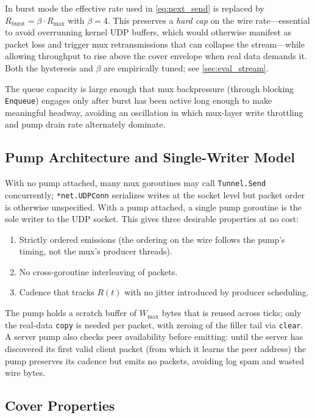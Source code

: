 \documentclass[11pt,a4paper]{article}
\begin{document}
In burst mode the effective rate used in \eqref{eq:next_send} is replaced by $R_{\text{burst}} = \beta \cdot R_{\max}$ with $\beta = 4$. This preserves a \emph{hard cap} on the wire rate---essential to avoid overrunning kernel UDP buffers, which would otherwise manifest as packet loss and trigger mux retransmissions that can collapse the stream---while allowing throughput to rise above the cover envelope when real data demands it. Both the hysteresis and $\beta$ are empirically tuned; see \cref{sec:eval_stream}.

The queue capacity is large enough that mux backpressure (through blocking \texttt{Enqueue}) engages only after burst has been active long enough to make meaningful headway, avoiding an oscillation in which mux-layer write throttling and pump drain rate alternately dominate.

\subsection{Pump Architecture and Single-Writer Model}\label{sec:pump_arch}

With no pump attached, many mux goroutines may call \texttt{Tunnel.Send} concurrently; \texttt{*net.UDPConn} serializes writes at the socket level but packet order is otherwise unspecified. With a pump attached, a single pump goroutine is the sole writer to the UDP socket. This gives three desirable properties at no cost:

\begin{enumerate}[nosep]
  \item Strictly ordered emissions (the ordering on the wire follows the pump's timing, not the mux's producer threads).
  \item No cross-goroutine interleaving of packets.
  \item Cadence that tracks $R(t)$ with no jitter introduced by producer scheduling.
\end{enumerate}

The pump holds a scratch buffer of $W_{\max}$ bytes that is reused across ticks; only the real-data \texttt{copy} is needed per packet, with zeroing of the filler tail via \texttt{clear}. A server pump also checks peer availability before emitting: until the server has discovered its first valid client packet (from which it learns the peer address) the pump preserves its cadence but emits no packets, avoiding log spam and wasted wire bytes.

\subsection{Cover Properties}\label{sec:cover_properties}
\end{document}
